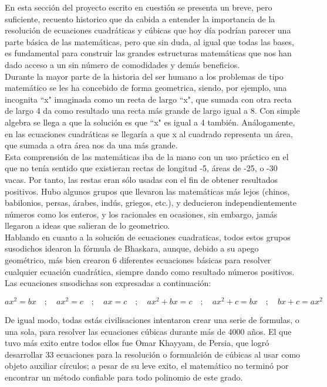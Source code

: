 \documentclass[12pt,letterpaper]{article}
\begin{document}
\noindent En esta sección del proyecto escrito en cuestión se presenta un breve, pero suficiente, recuento historico que da cabida a entender la importancia de la resolución de ecuaciones cuadráticas y cúbicas que hoy día podrían parecer una parte básica de las matemáticas, pero que sin duda, al igual que todas las bases, es fundamental para construir las grandes estructuras matemáticas que nos han dado acceso a un sin número de comodidades y demás beneficios.
\\

\noindent Durante la mayor parte de la historia del ser humano a los problemas de tipo matemático se les ha concebido de forma geometrica, siendo, por ejemplo, una incognita ``x" imaginada como un recta de largo ``x", que sumada con otra recta de largo 4 da como resultado una recta más grande de largo igual a 8. Con simple algebra se llega a que la solución es que ``x" es igual a 4 también. Análogamente, en las ecuaciones cuadráticas se llegaría a que x al cuadrado representa un área, que sumada a otra área nos da una más grande.
\\

\noindent Esta comprensión de las matemáticas iba de la mano con un uso práctico en el que no tenía sentido que existieran rectas de longitud -5, áreas de -25, o -30 vacas. Por tanto, las restas eran sólo usadas con el fin de obtener resultados positivos. Hubo algunos grupos que llevaron las matemáticas más lejos (chinos, babilonios, persas, árabes, indús, griegos, etc.), y deducieron independientemente números como los enteros, y los racionales en ocasiones, sin embargo, jamás llegaron a ideas que salieran de lo geometrico.
\\

\noindent Hablando en cuanto a la solución de ecuaciones cuadraticas, todos estos grupos susodichos idearon la fórmula de Bhaskara, aunque, debido a su apego geométrico, más bien crearon 6 diferentes ecuaciones básicas para resolver cualquier ecuación cuadrática, siempre dando como resultado números positivos. Las ecuaciones susodichas son expresadas a continuación:

$$ax^{2} = bx\quad ;\quad ax^{2}=c\quad ;\quad ax=c\quad ;\quad ax^{2}+bx=c\quad ;\quad ax^{2}+c=bx\quad ;\quad bx+c=ax^{2}$$

\noindent De igual modo, todas estás civilisaciones intentaron crear una serie de formulas, o una sola, para resolver las ecuaciones cúbicas durante más de 4000 años. El que tuvo más exito entre todos ellos fue Omar Khayyam, de Persia, que logró desarrollar 33 ecuaciones para la resolución o formualción de cúbicas al usar como objeto auxiliar círculos; a pesar de su leve exito, el matemático no terminó por encontrar un método confiable para todo polinomio de este grado.
\\
\end{document}
